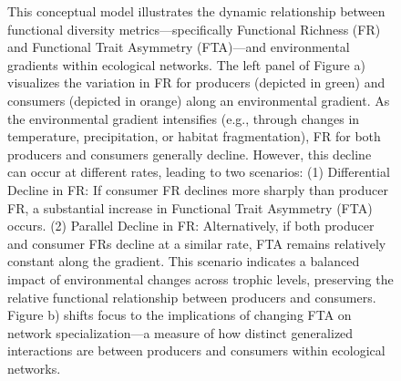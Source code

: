 \documentclass[
]{agujournal2019}
\begin{document}
\begin{figure}


\caption{\label{fig-01}This conceptual model illustrates the dynamic
relationship between functional diversity metrics---specifically
Functional Richness (FR) and Functional Trait Asymmetry (FTA)---and
environmental gradients within ecological networks. The left panel of
Figure a) visualizes the variation in FR for producers (depicted in
green) and consumers (depicted in orange) along an environmental
gradient. As the environmental gradient intensifies (e.g., through
changes in temperature, precipitation, or habitat fragmentation), FR for
both producers and consumers generally decline. However, this decline
can occur at different rates, leading to two scenarios: (1) Differential
Decline in FR: If consumer FR declines more sharply than producer FR, a
substantial increase in Functional Trait Asymmetry (FTA) occurs. (2)
Parallel Decline in FR: Alternatively, if both producer and consumer FRs
decline at a similar rate, FTA remains relatively constant along the
gradient. This scenario indicates a balanced impact of environmental
changes across trophic levels, preserving the relative functional
relationship between producers and consumers. Figure b) shifts focus to
the implications of changing FTA on network specialization---a measure
of how distinct generalized interactions are between producers and
consumers within ecological networks.}

\end{figure}%
\end{document}
